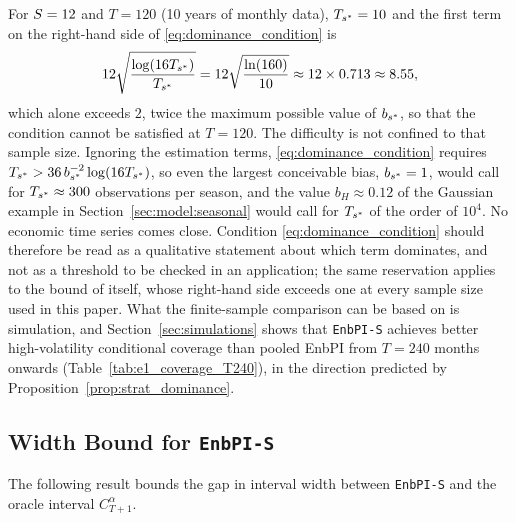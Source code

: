 \begin{remark}
\label{rem:dominance_practical}
For $S = 12$ and $T = 120$ (10 years of monthly data),
$T_{s^*} = 10$ and the first term on the right-hand side of
\eqref{eq:dominance_condition} is
\[
  12\sqrt{\frac{\log(16T_{s^*})}{T_{s^*}}}
  = 12\sqrt{\frac{\ln(160)}{10}}
  \approx 12 \times 0.713 \approx 8.55,
\]
which alone exceeds $2$, twice the maximum possible value of
$b_{s^*}$, so that the condition cannot be satisfied at $T = 120$.
The difficulty is not confined to that sample size.  Ignoring the
estimation terms, \eqref{eq:dominance_condition} requires
$T_{s^*} > 36\,b_{s^*}^{-2}\log(16T_{s^*})$, so even the largest conceivable
bias, $b_{s^*} = 1$, would call for $T_{s^*} \approx 300$ observations
per season, and the value $b_H \approx 0.12$ of the Gaussian example
in Section~\ref{sec:model:seasonal} would call for $T_{s^*}$ of the order
of $10^{4}$.  No economic time series comes close.  Condition
\eqref{eq:dominance_condition} should therefore be read as a
qualitative statement about which term dominates, and not as a
threshold to be checked in an application; the same reservation
applies to the bound of \citet[Theorem~1]{xu2023conformal} itself,
whose right-hand side exceeds one at every sample size used in this
paper.  What the finite-sample comparison can be based on is
simulation, and Section~\ref{sec:simulations} shows that
\texttt{EnbPI-S} achieves better high-volatility conditional coverage
than pooled EnbPI from $T = 240$ months onwards
(Table~\ref{tab:e1_coverage_T240}), in the direction predicted by
Proposition~\ref{prop:strat_dominance}.
\end{remark}

\subsection{Width Bound for \texttt{EnbPI-S}}
\label{sec:theory:width}

The following result bounds the gap in interval width between
\texttt{EnbPI-S} and the oracle interval $C_{T+1}^{\alpha}$.

